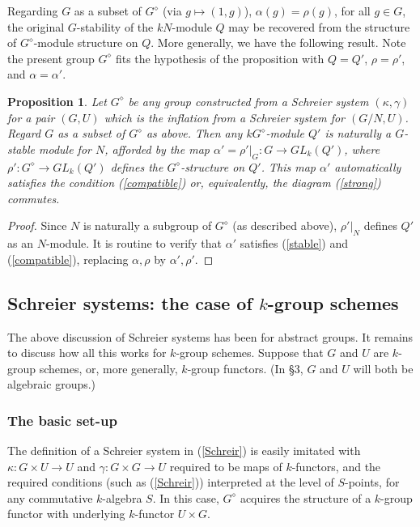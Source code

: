 \documentclass[11pt,leqno,amscd,amssymb,verbatim, url]{amsart}
\newtheorem{prop}[thm]{Proposition}
\theoremstyle{definition}
\numberwithin{equation}{thm}
\begin{document}
Regarding $G$ as a subset of $G^\diamond$ (via $g\mapsto (1,g)$), $\alpha(g)=\rho(g)$, for all $g\in G$, the original $G$-stability of the $kN$-module $Q$ may be recovered from the structure of $G^\diamond$-module structure on $Q$. More generally,
we have the following result. Note the present group $G^\diamond$ fits the hypothesis of the proposition with $Q=Q'$, $\rho=\rho'$,
and $\alpha=\alpha'$.

\begin{prop}\label{notneeded} Let $G^\diamond$ be any group constructed from a Schreier system $(\kappa,\gamma)$ for a pair $(G,U)$ which is
the inflation from a Schreier system for $(G/N,U)$.  Regard $G$ as a subset of $G^\diamond$ as
above. Then any $kG^\diamond$-module $Q'$ is naturally a $G$-stable module for $N$,
afforded by the map $\alpha'=\rho'|_G:G\to GL_k(Q')$, where $\rho':G^\diamond\to GL_k(Q')$ defines
the $G^\diamond$-structure on $Q'$. This map $\alpha'$ automatically satisfies the condition (\ref{compatible}) or, equivalently,
the diagram (\ref{strong}) commutes. \end{prop}

\begin{proof}  Since $N$ is naturally a subgroup
of $G^\diamond$ (as described above), $\rho'|_N$ defines $Q'$ as an $N$-module. It is routine to verify that $\alpha'$ satisfies (\ref{stable}) and (\ref{compatible}), replacing $\alpha,\rho$ by $\alpha',\rho'$.
\end{proof}

\subsection{Schreier systems: the case of $k$-group schemes} The above discussion of Schreier systems has been for abstract groups.
It remains to discuss how all this works for $k$-group schemes.
Suppose that $G$ and $U$ are $k$-group schemes, or, more generally, $k$-group functors.
(In \S3, $G$ and $U$ will both be algebraic groups.)

\subsubsection{The basic set-up}
The definition of
a Schreier system in (\ref{Schreir}) is easily imitated with $\kappa:G\times U\to U$ and $\gamma:G\times G\to U$
required to be maps of $k$-functors, and the required  conditions (such as (\ref{Schreir})) interpreted at
the level of $S$-points, for any commutative $k$-algebra $S$. In this case, $G^\diamond$ acquires the structure of
a $k$-group functor with underlying $k$-functor $U\times G$.
\end{document}

